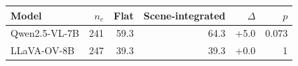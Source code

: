\begin{tabular}{lrrrrr}
\toprule
Model & $n_c$ & Flat & Scene-integrated & $\Delta$ & $p$ \\
\midrule
Qwen2.5-VL-7B & 241 & 59.3 & 64.3 & +5.0 & 0.073 \\
LLaVA-OV-8B & 247 & 39.3 & 39.3 & +0.0 & 1 \\
\bottomrule
\end{tabular}
